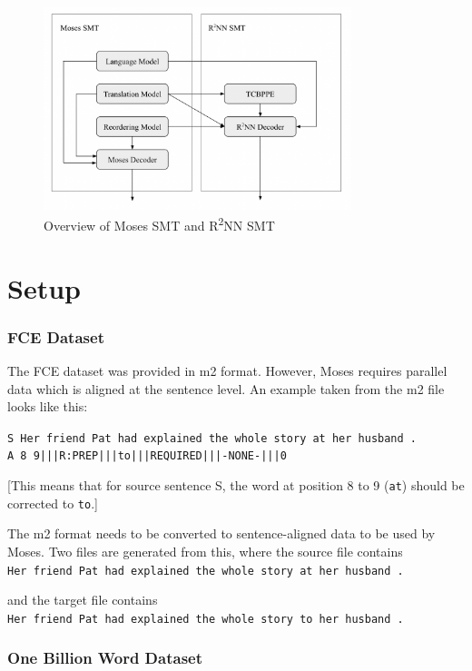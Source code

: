 \documentclass[12pt,a4paper,twoside,openright]{report}
\begin{document}
\begin{figure}[ht]
\centering
\includegraphics[width=0.8\textwidth]{images/overview_moses_r2nn.png}
\caption{Overview of Moses SMT and R\textsuperscript{2}NN SMT}
\label{fig:moses_r2nn}
\end{figure}

\section{Setup}

\subsubsection{FCE Dataset}

The FCE dataset was provided in m2 format. However, Moses requires parallel data which is aligned at the sentence level. An example taken from the m2 file looks like this:

\texttt{S Her friend Pat had explained the whole story at her husband .\\
A 8 9|||R:PREP|||to|||REQUIRED|||-NONE-|||0}

[This means that for source sentence S, the word at position 8 to 9 (\texttt{at}) should be corrected to \texttt{to}.]

The m2 format needs to be converted to sentence-aligned data to be used by Moses. Two files are generated from this, where the source file contains\\
\texttt{Her friend Pat had explained the whole story at her husband .}

and the target file contains\\
\texttt{Her friend Pat had explained the whole story to her husband .}

\subsubsection{One Billion Word Dataset}
\end{document}
